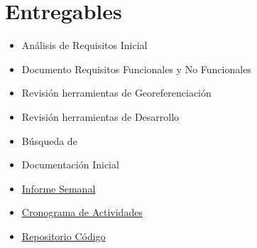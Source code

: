\section{Entregables}

\begin{itemize}

	\item Análisis de Requisitos Inicial

	\item Documento Requisitos Funcionales y No Funcionales

	\item Revisión herramientas de Georeferenciación

	\item Revisión herramientas de Desarrollo 

	\item Búsqueda de 

	\item Documentación Inicial

	\item \href{https://github.com/smonsalve/Epi/blob/master/informes/Semana1/Informe1.pdf}{Informe Semanal}

	\item \href{https://github.com/smonsalve/Epi/blob/master/doc/Cronograma.md} {Cronograma de Actividades}

	\item \href{https://github.com/smonsalve/Epi}{Repositorio Código}

\end{itemize}